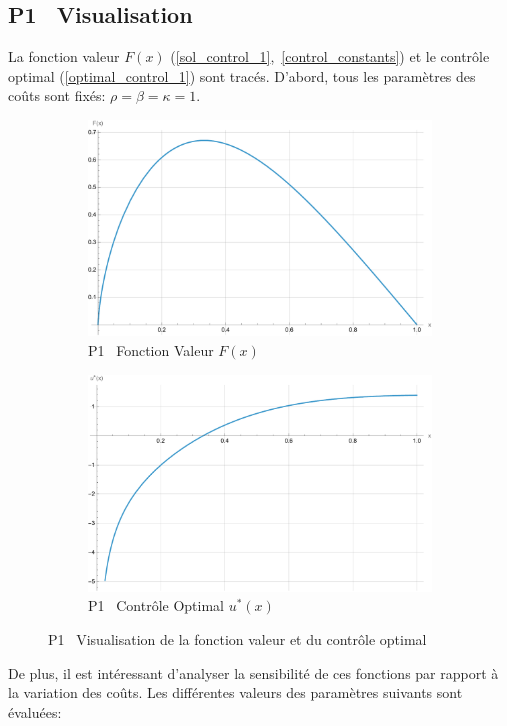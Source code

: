 \subsection{P1 \textemdash~Visualisation}
La fonction valeur $F(x)$ (\ref{sol_control_1},~\ref{control_constants}) et le contrôle optimal (\ref{optimal_control_1}) sont tracés. D'abord, tous les paramètres des coûts sont fixés: $\rho=\beta=\kappa=1$.
\begin{figure}[htb]
    \centering
    \begin{subfigure}{0.45\linewidth}
        \includegraphics[width=\linewidth]{img/validation/P1/p1_value.pdf}
        \caption{P1 \textemdash~Fonction Valeur $F(x)$}\label{fig:ValueVisualisation1}
    \end{subfigure}
    \hfill
    \begin{subfigure}{0.45\linewidth}
        \includegraphics[width=\linewidth]{img/validation/P1/p1_control.pdf}
        \caption{P1 \textemdash~Contrôle Optimal $u^*(x)$}\label{fig:ControlVisualisation1}
    \end{subfigure}
    \caption{P1 \textemdash~Visualisation de la fonction valeur et du contrôle optimal}\label{fig:ValueControlComparison1}
\end{figure}\FloatBarrier De plus, il est intéressant d'analyser la sensibilité de ces fonctions par rapport à la variation des coûts. Les différentes valeurs des paramètres suivants sont évaluées:
